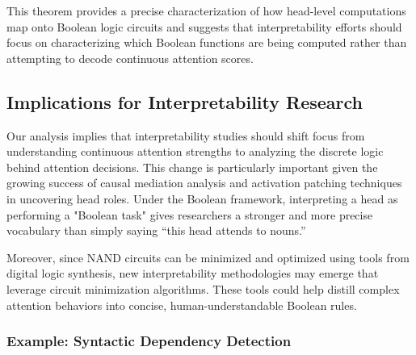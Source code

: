 This theorem provides a precise characterization of how head-level computations map onto Boolean logic circuits and suggests that interpretability efforts should focus on characterizing which Boolean functions are being computed rather than attempting to decode continuous attention scores.













\subsection{Implications for Interpretability Research}













Our analysis implies that interpretability studies should shift focus from understanding continuous attention strengths to analyzing the discrete logic behind attention decisions. This change is particularly important given the growing success of causal mediation analysis and activation patching techniques in uncovering head roles. Under the Boolean framework, interpreting a head as performing a "Boolean task" gives researchers a stronger and more precise vocabulary than simply saying “this head attends to nouns.”













Moreover, since NAND circuits can be minimized and optimized using tools from digital logic synthesis, new interpretability methodologies may emerge that leverage circuit minimization algorithms. These tools could help distill complex attention behaviors into concise, human-understandable Boolean rules.













\subsubsection*{Example: Syntactic Dependency Detection}













